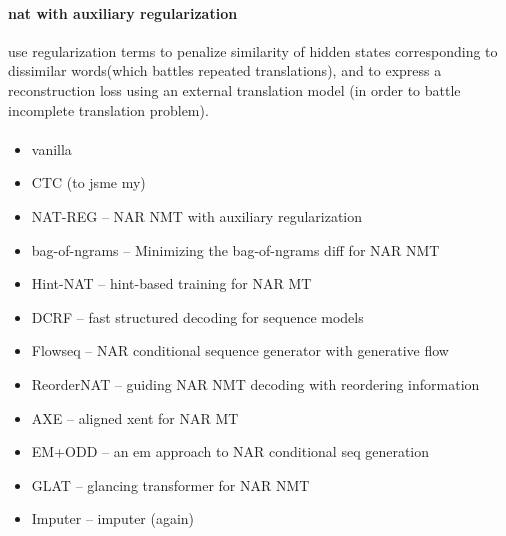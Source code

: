 \paragraph{\Gls{nat} with auxiliary regularization}
\citet{wang2019nonautoregressive} use regularization terms to penalize
similarity of hidden states corresponding to dissimilar words(which battles
repeated translations), and to express a reconstruction loss using an external
translation model (in order to battle incomplete translation problem).

\paragraph{\citep{shao2020minimizing}}







\begin{itemize}
\item vanilla \citep{gu2017nonautoregressive}
\item CTC (to jsme my)
\item NAT-REG \citep{wang2019nonautoregressive} -- NAR NMT with auxiliary regularization
\item bag-of-ngrams \citep{shao2020minimizing} -- Minimizing the bag-of-ngrams diff for NAR NMT
\item Hint-NAT \citep{li2019hint} -- hint-based training for NAR MT
\item DCRF \citep{sun2019fast} -- fast structured decoding for sequence models
\item Flowseq \citep{ma2019flowseq} -- NAR conditional sequence generator with generative flow
\item ReorderNAT \citep{ran2019guiding} -- guiding NAR NMT decoding with reordering information
\item AXE \citep{ghazvininejad2020aligned} -- aligned xent for NAR MT
\item EM+ODD \citep{sun2020em} -- an em approach to NAR conditional seq generation
\item GLAT \citep{qian2020glancing} -- glancing transformer for NAR NMT
\item Imputer \citep{saharia2020nonautoregressive} -- imputer (again)
\end{itemize}

